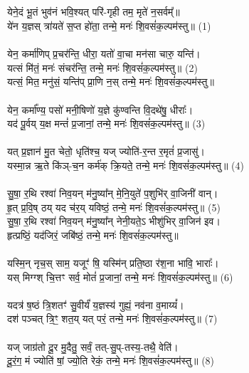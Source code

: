 \subsection{}
येने॒दं भू॒तं भुव॑नं भवि॒श्यत् परि॑-गृही तम॒ मृते॑ न॒सर्वम्᳚॥ \\
ये॑न य॒ज्ञस् त्रा॑यते॑ स॒प्त हो॑ता॒ तन्मे॒ मनः॑ शि॒वसं॑क॒ल्पम॑स्तु॥ (1)\\
\\
येन॒ कर्मा॑णिप् प्र॒चर॑न्ति॒ धीरा॒ यतो॑ वा॒चा मन॑सा चारु॒ यन्ति॑। \\
यत्सं मि॑तं॒ मनः॑ संचर॑न्ति॒ तन्मे॒ मनः॑ शि॒वसं॑क॒ल्पम॑स्तु॥ (2)\\
{\small यत्सं॒ मित॒ मनु॑सं॒ यन्ति॑प् प्रा॒णि न॒स् तन्मे॒ मनः॑ शि॒वसं॑क॒ल्पम॑स्तु॥}\\
\\
येन॒ कर्मा᳚ण्य॒ पसो॑ मनी॒षिणो॑ य॒ज्ञे कु॑ण्वन्ति वि॒दथे॑षु॒ धीराः᳚। \\
यद॑ पू॒र्वय् य॒क्ष मन्तं॑ प्र॒जानां॒ तन्मे॒ मनः॑ शि॒वसं॑क॒ल्पम॑स्तु॥ (3)\\
\\
यत् प्र॒ज्ञान॑ मु॒त चेतो॒ धृति॑श्च॒ यज् ज्योति॑-र॒न्त र॒मृतं॑ प्र॒जासु॑।\\
यस्मा॒न्न ऋ॒ते कि॑ञ्-च॒न कर्म॑क् क्रि॒यते॒ तन्मे॒ मनः॑ शि॒वसं॑क॒ल्पम॑स्तु॥ (4)\\
\\
सु॒षा॒ र॒थि रश्वा॑ निव॒यन् म॑नु॒ष्या᳚न् मे॒नि॒युते॑ प॒शुभि॑र् वा॒जिनी॑ वान्। \\
हृ॒त् प्र॒वि॒ष् ठय् यद च॑र॒य् यविष्ठं॒ तन्मे॒ मनः॑ शि॒वसं॑क॒ल्पम॑स्तु॥ (5)\\
{\small सु॒षा॒ र॒थि रश्वा॑ निव॒यन् म॑नु॒ष्या᳚न् नेनी॒यते॒ऽ भीशु॑भिर् वा॒जिन॑ इव।\\
हृत्प्रष्ठिं॒ यद॑जिरं॒ जबि॑ष्ठं॒ तन्मे॒ मनः॑ शि॒वसं॑क॒ल्पम॑स्तु॥}\\
\\
यस्मि॒न् नृच॒स् साम॒ यजूꣳ॑ षि॒ यस्मि॑न् प्रति॒ष्ठा र॑श॒ना भावि॒ भाराः᳚। \\
यस् मिग्ग्श् चि॒त्तꣳ सर्व॒ मोतं॑ प्र॒जानां॒ तन्मे॒ मनः॑ शि॒वसं॑क॒ल्पम॑स्तु॥ (6)\\
\\
यदत्र॑ ष॒ष्ठं त्रि॒शतꣳ॑ सु॒वीर्यं॑ य॒ज्ञस्य॑ गुह्यं॒ नव॑ना व॒माय्यं᳚। \\
दश॑ पञ्चत् त्रि॒ꣳ॒ शत॒य् यत् परं॒ तन्मे॒ मनः॑ शि॒वसं॑क॒ल्पम॑स्तु॥ (7)\\
\\
यज् जाग्र॑तो दू॒र मु॒दैतु॒ सर्वं॒ तत्-सु॒प्-तस्य॒-तथै॒ वेति॑।\\
दू॒रं॒ग॒ मं ज्योति॑ षां॒ ज्यो॒ति रेकं॒ तन्मे॒ मनः॑ शि॒वसं॑क॒ल्पम॑स्तु॥ (8)\\
